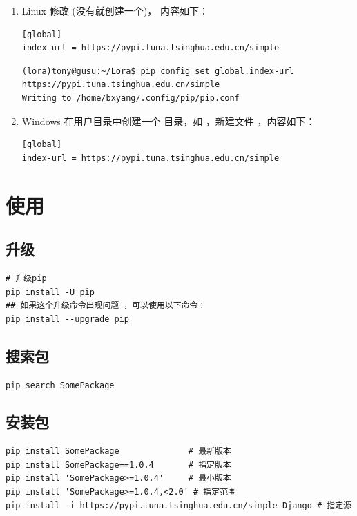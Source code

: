 \begin{enumerate}[label=\arabic*)]
    \item Linux
    修改  (没有就创建一个)， 内容如下：
\begin{lstlisting}[style=demostyle,numbers=none]
[global]
index-url = https://pypi.tuna.tsinghua.edu.cn/simple
\end{lstlisting}

\begin{lstlisting}[style=demostyle,numbers=none]
(lora)tony@gusu:~/Lora$ pip config set global.index-url https://pypi.tuna.tsinghua.edu.cn/simple
Writing to /home/bxyang/.config/pip/pip.conf
\end{lstlisting}

    \item Windows
    在用户目录中创建一个  目录，如 ，新建文件 ，内容如下：
\begin{lstlisting}[style=demostyle,numbers=none]
[global]
index-url = https://pypi.tuna.tsinghua.edu.cn/simple
\end{lstlisting}

\end{enumerate}


\section{使用}
\subsection{升级}
\begin{lstlisting}[style=demostyle,numbers=none]
# 升级pip
pip install -U pip 
## 如果这个升级命令出现问题 ，可以使用以下命令：
pip install --upgrade pip
\end{lstlisting}

\subsection{搜索包}
\begin{lstlisting}[style=demostyle,numbers=none]
pip search SomePackage
\end{lstlisting}

\subsection{安装包}
\begin{lstlisting}[style=demostyle,numbers=none]
pip install SomePackage              # 最新版本
pip install SomePackage==1.0.4       # 指定版本
pip install 'SomePackage>=1.0.4'     # 最小版本
pip install 'SomePackage>=1.0.4,<2.0' # 指定范围
pip install -i https://pypi.tuna.tsinghua.edu.cn/simple Django # 指定源
\end{lstlisting}


